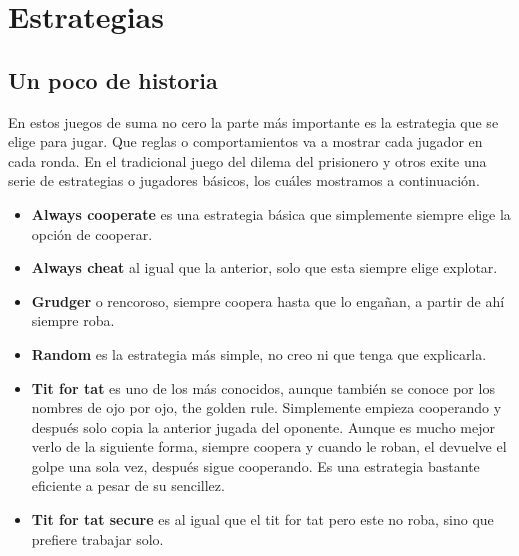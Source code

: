 \documentclass{article}
\begin{document}
\section{Estrategias}
\subsection{Un poco de historia}
En estos juegos de suma no cero la parte m\'as importante es la estrategia que se elige para jugar. Que reglas o comportamientos va a mostrar cada jugador en cada ronda.
En el tradicional juego del dilema del prisionero y otros exite una serie de estrategias o jugadores b\'asicos, los cu\'ales mostramos a continuaci\'on.
\begin{itemize}
      \item \textbf{Always cooperate} es una estrategia b\'asica que simplemente siempre elige la opci\'on de cooperar.
      \item \textbf{Always cheat} al igual que la anterior, solo que esta siempre elige explotar.
      \item \textbf{Grudger} o rencoroso, siempre coopera hasta que lo enga\~nan, a partir de ah\'i siempre roba.
      \item \textbf{Random} es la estrategia m\'as simple, no creo ni que tenga que explicarla.
      \item \textbf{Tit for tat} es uno de los m\'as conocidos, aunque tambi\'en se conoce por los nombres de ojo por ojo, the golden rule. Simplemente empieza cooperando
            y despu\'es solo copia la anterior jugada del oponente. Aunque es mucho mejor verlo de la siguiente forma, siempre coopera y cuando le roban, el devuelve el
            golpe una sola vez, despu\'es sigue cooperando. Es una estrategia bastante eficiente a pesar de su sencillez.
      \item \textbf{Tit for tat secure} es al igual que el tit for tat pero este no roba, sino que prefiere trabajar solo.
\end{itemize}
\end{document}
